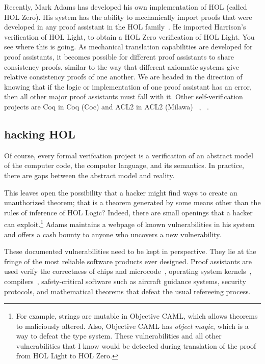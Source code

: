 \documentclass{llncs}
\begin{document}
Recently, Mark Adams has developed his own implementation of HOL
(called HOL Zero).  His system has the ability to mechanically import
proofs that were developed in any proof assistant in the HOL
family~\cite{Adams}.  He imported Harrison's verification of HOL
Light, to obtain a HOL Zero verification of HOL Light.  You see where
this is going.  As mechanical translation capabilities are developed
for proof assistants, it becomes possible for different proof
assistants to share consistency proofs, similar to the way that
different axiomatic systems give relative consistency proofs of one
another.  We are headed in the direction of knowing that if the logic
or implementation of one proof assistant has an error, then all other major
proof assistants must fall with it. Other self-verification projects
are Coq in Coq (Coc) and ACL2 in ACL2 (Milawa) ~\cite{Bar98}, ~\cite{Dav09}.

\subsection{hacking HOL}

Of course, every formal verifcation project is a verification of an
abstract model of the computer code, the computer language, and its
semantics.  In practice, there are gaps between the abstract
model and reality.

  
This leaves open the possibility that a hacker might find ways to
create an unauthorized theorem; that is a theorem generated by some
means other than the rules of inference of HOL Logic?  Indeed, there
are small openings that a hacker can exploit.\footnote{For example,
  strings are mutable in Objective CAML, which allows theorems to
  maliciously altered.  Also, Objective CAML has {\it object magic},
  which is a way to defeat the type system.  These vulnerabilities
  and all other vulnerabilities that I know
  would be detected during translation of the proof from HOL Light to
  HOL Zero.}  Adams maintains a
webpage of known vulnerabilities in his system and offers a cash
bounty to anyone who uncovers a new vulnerability.

These documented vulnerabilities need to be kept in perspective.  They
lie at the fringe of the most reliable software products ever
designed. Proof assistants are used verify the correctness of chips
and microcode~\cite{FoxArm6}, operating system kernels~\cite{seL4}, 
compilers~\cite{CC}, safety-critical software such as aircraft
guidance systems, security protocols, and mathematical theorems that
defeat the usual refereeing process.  
\end{document}
